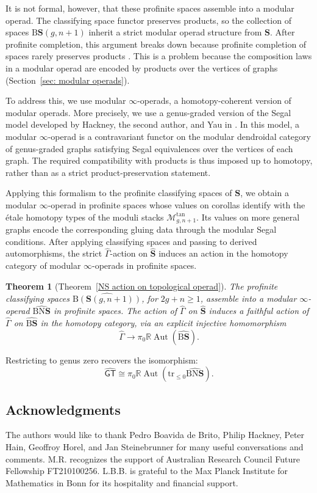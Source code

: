 \documentclass{amsart}
\newcommand{\bS}{\mathbf{S}}
\newcommand{\cs}{\mathrm{B}}
\newcommand{\nerve}{\mathrm{N}}
\newcommand{\trun}[1]{\mathrm{tr}_{\leq{#1}}}
\newcommand{\GT}{\widehat{\mathsf{GT}}}
\newcommand{\NS}{\widehat{\mathsf{\Gamma}}}
\newtheorem*{thm*}{Theorem}
\theoremstyle{definition}
\numberwithin{equation}{section}
\begin{document}
It is not formal, however, that these profinite spaces assemble into a modular operad. The classifying space functor preserves products, so the collection of spaces $\cs\bS(g,n+1)$ inherit a strict modular operad structure from $\bS$. After profinite completion, this argument breaks down because profinite completion of spaces rarely preserves products \cite[Proposition~3.9]{Boavida-Horel-Robertson}. This is a problem because the composition laws in a modular operad are encoded by products over the vertices of graphs (Section~\ref{sec: modular operads}).

To address this, we use modular $\infty$-operads, a homotopy-coherent version of modular operads. More precisely, we use a genus-graded version of the Segal model developed by Hackney, the second author, and Yau in \cite{hry1}. In this model, a modular $\infty$-operad is a contravariant functor on the modular dendroidal category of genus-graded graphs satisfying Segal equivalences over the vertices of each graph. The required compatibility with products is thus imposed up to homotopy, rather than as a strict product-preservation statement.


Applying this formalism to the profinite classifying spaces of $\bS$, we obtain a modular $\infty$-operad in profinite spaces whose values on corollas identify with the \'etale homotopy types of the moduli stacks $\mathcal M_{g,n+1}^{\tan}$. Its values on more general graphs encode the corresponding gluing data through the modular Segal conditions. After applying classifying spaces and passing to derived automorphisms, the strict $\NS$-action on $\widehat{\bS}$ induces an action in the homotopy category of modular $\infty$-operads in profinite spaces.


\begin{thm*}[Theorem~\ref{NS action on topological operad}]
The profinite classifying spaces $\widehat{\cs(\bS(g,n+1))}$, for $2g+n\geq1$, assemble into a modular $\infty$-operad $\widehat{\cs\nerve\bS}$ in profinite spaces. The action of $\NS$ on $\widehat{\bS}$ induces a faithful action of $\NS$
on $\widehat{\cs\bS}$ in the homotopy category, via an explicit injective homomorphism
    \[\NS\longrightarrow \pi_0\mathbb R\operatorname{Aut}(\widehat{\cs\bS}).\]
\end{thm*}

Restricting to genus zero recovers the isomorphism:
\[
\GT\cong \pi_0\mathbb R\operatorname{Aut}
(\trun{0}\widehat{\cs\nerve\bS}).
\]


\subsection{Acknowledgments}
The authors would like to thank Pedro Boavida de Brito, Philip Hackney, Peter Hain, Geoffroy Horel, and Jan Steinebrunner for many useful conversations and comments.  M.R. recognizes the support of Australian Research Council Future Fellowship FT210100256. L.B.B. is grateful to the Max Planck Institute for Mathematics in Bonn for its hospitality and financial support.
\end{document}
